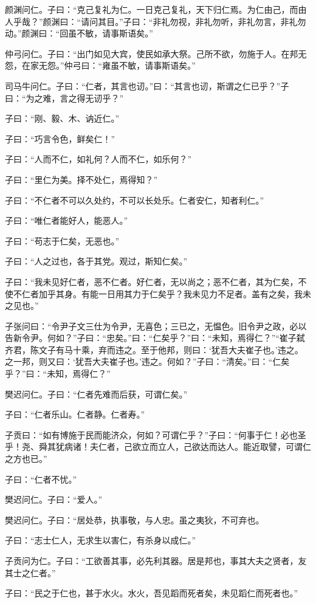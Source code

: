 \documentclass[a5paper]{ctexbook}
\begin{document}
    颜渊问仁。子曰：“克己复礼为仁。一日克己复礼，天下归仁焉。为仁由己，而由人乎哉？”颜渊曰：“请问其目。”子曰：“非礼勿视，非礼勿听，非礼勿言，非礼勿动。”颜渊曰：“回虽不敏，请事斯语矣。”

    仲弓问仁。子曰：“出门如见大宾，使民如承大祭。己所不欲，勿施于人。在邦无怨，在家无怨。”仲弓曰：“雍虽不敏，请事斯语矣。”

    司马牛问仁。子曰：“仁者，其言也讱。”曰：“其言也讱，斯谓之仁已乎？”子曰：“为之难，言之得无讱乎？”

    子曰：“刚、毅、木、讷近仁。”

    子曰：“巧言令色，鲜矣仁！”

    子曰：“人而不仁，如礼何？人而不仁，如乐何？”

    子曰：“里仁为美。择不处仁，焉得知？”

    子曰：“不仁者不可以久处约，不可以长处乐。仁者安仁，知者利仁。”

    子曰：“唯仁者能好人，能恶人。”

    子曰：“苟志于仁矣，无恶也。”

    子曰：“人之过也，各于其党。观过，斯知仁矣。”

    子曰：“我未见好仁者，恶不仁者。好仁者，无以尚之；恶不仁者，其为仁矣，不使不仁者加乎其身。有能一日用其力于仁矣乎？我未见力不足者。盖有之矣，我未之见也。”

    子张问曰：“令尹子文三仕为令尹，无喜色；三已之，无愠色。旧令尹之政，必以告新令尹。何如？”子曰：“忠矣。”曰：“仁矣乎？”曰：“未知，焉得仁？”“崔子弑齐君，陈文子有马十乘，弃而违之。至于他邦，则曰：‘犹吾大夫崔子也。’违之。之一邦，则又曰：‘犹吾大夫崔子也。’违之。何如？”子曰：“清矣。”曰：“仁矣乎？”曰：“未知，焉得仁？”

    樊迟问仁。子曰：“仁者先难而后获，可谓仁矣。”

    子曰：“仁者乐山。仁者静。仁者寿。”

    子贡曰：“如有博施于民而能济众，何如？可谓仁乎？”子曰：“何事于仁！必也圣乎！尧、舜其犹病诸！夫仁者，己欲立而立人，己欲达而达人。能近取譬，可谓仁之方也已。”

    子曰：“仁者不忧。”

    樊迟问仁。子曰：“爱人。”

    樊迟问仁。子曰：“居处恭，执事敬，与人忠。虽之夷狄，不可弃也。

    子曰：“志士仁人，无求生以害仁，有杀身以成仁。”

    子贡问为仁。子曰：“工欲善其事，必先利其器。居是邦也，事其大夫之贤者，友其士之仁者。”

    子曰：“民之于仁也，甚于水火。水火，吾见蹈而死者矣，未见蹈仁而死者也。”
\end{document}
